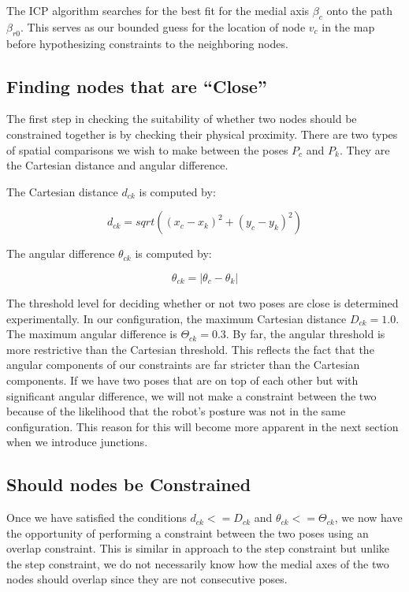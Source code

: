 The ICP algorithm searches for the best fit for the medial axis $\beta_c$ onto the path $\beta_{r0}$.  This serves as our bounded guess for the location of node $v_c$ in the map before hypothesizing constraints to the neighboring nodes.

\subsection{Finding nodes that are “Close”}

The first step in checking the suitability of whether two nodes should be constrained together is by checking their physical proximity.  There are two types of spatial comparisons we wish to make between the poses $P_c$ and $P_k$.   They are the Cartesian distance and angular difference.

The Cartesian distance $d_{ck}$ is computed by:


\begin{equation}
d_{ck} = sqrt( (x_c - x_k)^2 + (y_c - y_k)^2 )
\end{equation}

The angular difference $\theta_{ck}$ is computed by:

\begin{equation}
\theta_{ck} = | \theta_c - \theta_k |
\end{equation}

The threshold level for deciding whether or not two poses are close is determined experimentally.  In our configuration, the maximum Cartesian distance $D_{ck} = 1.0$.   The maximum angular difference is $\Theta_{ck} = 0.3$.  By far, the angular threshold is more restrictive than the Cartesian threshold.  This reflects the fact that the angular components of our constraints are far stricter than the Cartesian components.   If we have two poses that are on top of each other but with significant angular difference, we will not make a constraint between the two because of the likelihood that the robot's posture was not in the same configuration.  This reason for this will become more apparent in the next section when we introduce junctions.

\subsection{Should nodes be Constrained}

Once we have satisfied the conditions $d_{ck} <= D_{ck}$ and $\theta_{ck} <= \Theta_{ck}$, we now have the opportunity of performing a constraint between the two poses using an overlap constraint.  This is similar in approach to the step constraint but unlike the step constraint, we do not necessarily know how the medial axes of the two nodes should overlap since they are not consecutive poses.  

